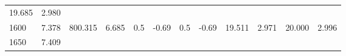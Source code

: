 \documentclass{article}
\begin{document}
\begin{longtable}[]{@{}llllllllllll@{}}
\begin{minipage}[t]{0.06\columnwidth}
19.685\strut
\end{minipage} & \begin{minipage}[t]{0.09\columnwidth}\raggedright\strut
2.980\strut
\end{minipage}\tabularnewline
\begin{minipage}[t]{0.03\columnwidth}\raggedright\strut
1600\strut
\end{minipage} & \begin{minipage}[t]{0.06\columnwidth}\raggedright\strut
7.378\strut
\end{minipage} & \begin{minipage}[t]{0.06\columnwidth}\raggedright\strut
800.315\strut
\end{minipage} & \begin{minipage}[t]{0.08\columnwidth}\raggedright\strut
6.685\strut
\end{minipage} & \begin{minipage}[t]{0.03\columnwidth}\raggedright\strut
0.5\strut
\end{minipage} & \begin{minipage}[t]{0.06\columnwidth}\raggedright\strut
-0.69\strut
\end{minipage} & \begin{minipage}[t]{0.03\columnwidth}\raggedright\strut
0.5\strut
\end{minipage} & \begin{minipage}[t]{0.06\columnwidth}\raggedright\strut
-0.69\strut
\end{minipage} & \begin{minipage}[t]{0.06\columnwidth}\raggedright\strut
19.511\strut
\end{minipage} & \begin{minipage}[t]{0.08\columnwidth}\raggedright\strut
2.971\strut
\end{minipage} & \begin{minipage}[t]{0.06\columnwidth}\raggedright\strut
20.000\strut
\end{minipage} & \begin{minipage}[t]{0.09\columnwidth}\raggedright\strut
2.996\strut
\end{minipage}\tabularnewline
\begin{minipage}[t]{0.03\columnwidth}\raggedright\strut
1650\strut
\end{minipage} & \begin{minipage}[t]{0.06\columnwidth}\raggedright\strut
7.409\strut
\end{minipage} & \begin{minipage}[t]{0.06\columnwidth}\raggedright\strut

\end{minipage}
\end{longtable}
\end{document}
